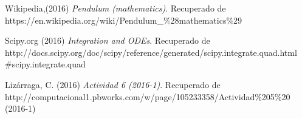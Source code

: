 \documentclass[12pt]{article}
\begin{document}
\begin{thebibliography}{3}

	Wikipedia,(2016)
	\emph{Pendulum (mathematics)}. Recuperado de\\
	https://en.wikipedia.org/wiki/Pendulum\_\%28mathematics\%29

	Scipy.org (2016)
	\emph{Integration and ODEs}. Recuperado de\\
	http://docs.scipy.org/doc/scipy/reference/generated/scipy.integrate.quad.html\\\#scipy.integrate.quad

	Lizárraga, C. (2016)
	\emph{Actividad 6 (2016-1)}. Recuperado de\\ 
	http://computacional1.pbworks.com/w/page/105233358/Actividad\%205\%20\\(2016-1)
	
\end{thebibliography}
\end{document}
